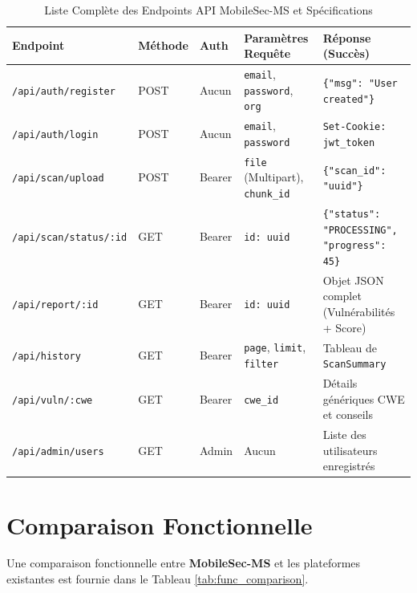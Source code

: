 \documentclass[
  journal=largetwo,
  manuscript=article-type,
  year=2025,
  volume=1,
]{cup-journal}
\begin{document}
\begin{table}[hbt!]
\centering
\caption{Liste Complète des Endpoints API MobileSec-MS et Spécifications}
\label{tab:api_specs}
\begin{tabular}{p{4cm}p{1.5cm}p{2cm}p{4cm}p{5cm}}
\toprule
\textbf{Endpoint} & \textbf{Méthode} & \textbf{Auth} & \textbf{Paramètres Requête} & \textbf{Réponse (Succès)} \\
\midrule
\texttt{/api/auth/register} & POST & Aucun & \texttt{email}, \texttt{password}, \texttt{org} & \texttt{\{"msg": "User created"\}} \\
\texttt{/api/auth/login} & POST & Aucun & \texttt{email}, \texttt{password} & \texttt{Set-Cookie: jwt\_token} \\
\texttt{/api/scan/upload} & POST & Bearer & \texttt{file} (Multipart), \texttt{chunk\_id} & \texttt{\{"scan\_id": "uuid"\}} \\
\texttt{/api/scan/status/:id} & GET & Bearer & \texttt{id: uuid} & \texttt{\{"status": "PROCESSING", "progress": 45\}} \\
\texttt{/api/report/:id} & GET & Bearer & \texttt{id: uuid} & Objet JSON complet (Vulnérabilités + Score) \\
\texttt{/api/history} & GET & Bearer & \texttt{page}, \texttt{limit}, \texttt{filter} & Tableau de \texttt{ScanSummary} \\
\texttt{/api/vuln/:cwe} & GET & Bearer & \texttt{cwe\_id} & Détails génériques CWE et conseils \\
\texttt{/api/admin/users} & GET & Admin & Aucun & Liste des utilisateurs enregistrés \\
\bottomrule
\end{tabular}
\end{table}

\section{Comparaison Fonctionnelle}
\label{app:comparison}

Une comparaison fonctionnelle entre \textbf{MobileSec-MS} et les plateformes existantes est fournie dans le Tableau \ref{tab:func_comparison}.
\end{document}
